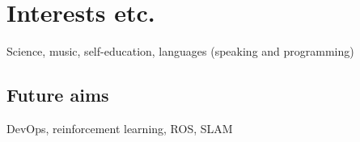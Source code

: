 \documentclass[letterpaper]{twentysecondcv} %
\begin{document}
\section{Interests etc.}

Science, music, self-education, languages (speaking and programming)

\subsection{Future aims}

DevOps, reinforcement learning, ROS, SLAM









\end{document}
